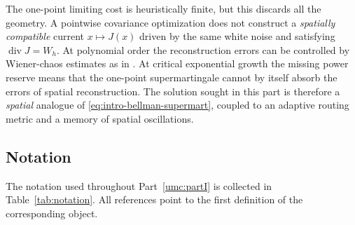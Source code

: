 \documentclass[11pt]{article}
\theoremstyle{definition}
\theoremstyle{remark}
\numberwithin{equation}{section}
\newcommand{\divv}{\operatorname{div}}
\begin{document}
The one-point limiting cost is heuristically finite, but this
discards all the geometry. A pointwise covariance optimization
does not construct a \emph{spatially compatible} current
$x\mapsto J(x)$ driven by the same white noise and satisfying
$\divv J=W_h$. At polynomial order the reconstruction errors
can be controlled by Wiener-chaos estimates as in
\cite{umc:AGGT26}. At critical exponential growth the missing
power reserve means that the one-point supermartingale cannot
by itself absorb the errors of spatial reconstruction.
The solution sought in this part is therefore a \emph{spatial}
analogue of \eqref{eq:intro-bellman-supermart}, coupled to an
adaptive routing metric and a memory of spatial oscillations.

\subsection{Notation}\label{subsec:notation}
The notation used throughout Part~\ref{umc:partI} is collected in Table~\ref{tab:notation}.
All references point to the first definition of the corresponding object.
\end{document}
